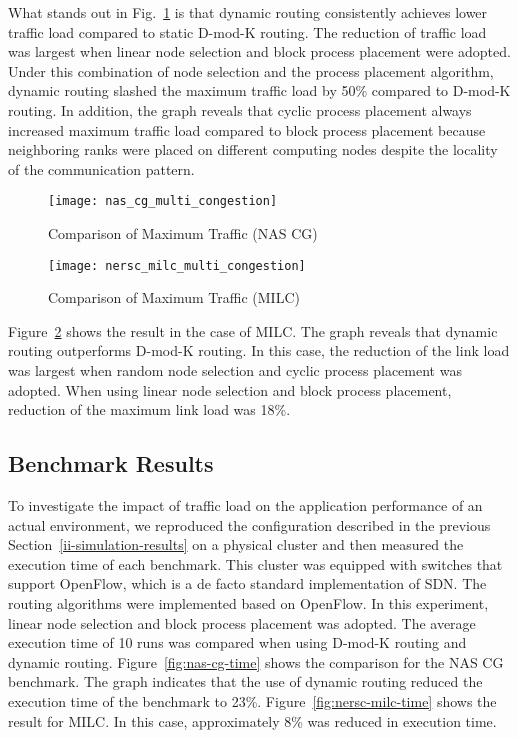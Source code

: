 What stands out in Fig.~\ref{fig:nas-cg-multi-congestion} is that
dynamic routing consistently achieves lower traffic load compared to
static \mbox{D-mod-K} routing. The reduction of traffic load was largest
when linear node selection and block process placement were adopted.
Under this combination of node selection and the process placement
algorithm, dynamic routing slashed the maximum traffic load by 50\%
compared to \mbox{D-mod-K} routing. In addition, the graph reveals that
cyclic process placement always increased maximum traffic load compared
to block process placement because neighboring ranks were placed on
different computing nodes despite the locality of the communication
pattern.

\begin{figure}
    \centering
    \texttt{[image: nas\_cg\_multi\_congestion]}
    \caption{Comparison of Maximum Traffic (NAS CG)}
    \label{fig:nas-cg-multi-congestion}
\end{figure}

\begin{figure}
    \centering
    \texttt{[image: nersc\_milc\_multi\_congestion]}
    \caption{Comparison of Maximum Traffic (MILC)}%
    \label{fig:nersc-milc-multi-congestion}
\end{figure}

Figure~\ref{fig:nersc-milc-multi-congestion} shows the result in the
case of MILC\@. The graph reveals that dynamic routing outperforms
\mbox{D-mod-K} routing. In this case, the reduction of the link load was
largest when random node selection and cyclic process placement was
adopted. When using linear node selection and block process placement,
reduction of the maximum link load was 18\%.

\subsection{Benchmark Results}

To investigate the impact of traffic load on the application performance
of an actual environment, we reproduced the configuration described in
the previous Section~\ref{ii-simulation-results} on a physical cluster and
then measured the execution time of each benchmark. This cluster was
equipped with switches that support OpenFlow, which is a de facto
standard implementation of SDN\@. The routing algorithms were implemented
based on OpenFlow. In this experiment, linear node selection and block
process placement was adopted. The average execution time of 10 runs was
compared when using \mbox{D-mod-K} routing and dynamic routing.
Figure~\ref{fig:nas-cg-time} shows the comparison for the NAS CG
benchmark. The graph indicates that the use of dynamic routing reduced
the execution time of the benchmark to 23\%.
Figure~\ref{fig:nersc-milc-time} shows the result for MILC\@. In this
case, approximately 8\% was reduced in execution time.

